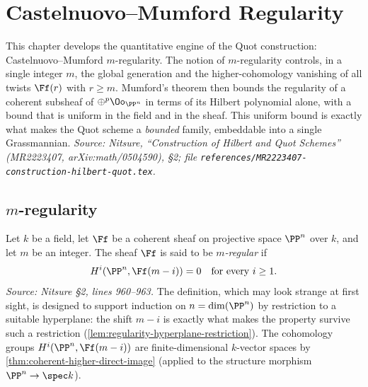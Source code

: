 \chapter{Castelnuovo--Mumford Regularity}
\label{chap:regularity}

This chapter develops the quantitative engine of the Quot construction:
Castelnuovo--Mumford $m$-regularity. The notion of $m$-regularity controls, in
a single integer $m$, the global generation and the higher-cohomology vanishing
of all twists $\Ff(r)$ with $r\ge m$. Mumford's theorem then bounds the
regularity of a coherent subsheaf of $\oplus^p\Oo_{\PP^n}$ in terms of its
Hilbert polynomial alone, with a bound that is uniform in the field and in the
sheaf. This uniform bound is exactly what makes the Quot scheme a \emph{bounded}
family, embeddable into a single Grassmannian.
\textit{Source: Nitsure, ``Construction of Hilbert and Quot Schemes'' (MR2223407,
arXiv:math/0504590), \S2; file
\texttt{references/MR2223407-construction-hilbert-quot.tex}.}

\section{$m$-regularity}

\begin{definition}
  \label{def:m-regular}
  Let $k$ be a field, let $\Ff$ be a coherent sheaf on projective space $\PP^n$
  over $k$, and let $m$ be an integer. The sheaf $\Ff$ is said to be
  \emph{$m$-regular} if
  \[
    H^i(\PP^n, \Ff(m-i)) = 0 \quad\text{for every } i \ge 1 .
  \]
  \textit{Source: Nitsure \S2, lines 960--963.}
  The definition, which may look strange at first sight, is designed to support
  induction on $n = \dim(\PP^n)$ by restriction to a suitable hyperplane: the
  shift $m-i$ is exactly what makes the property survive such a restriction
  (\cref{lem:regularity-hyperplane-restriction}). The cohomology groups
  $H^i(\PP^n,\Ff(m-i))$ are finite-dimensional $k$-vector spaces by
  \cref{thm:coherent-higher-direct-image} (applied to the structure morphism
  $\PP^n\to\spec k$).
\end{definition}

